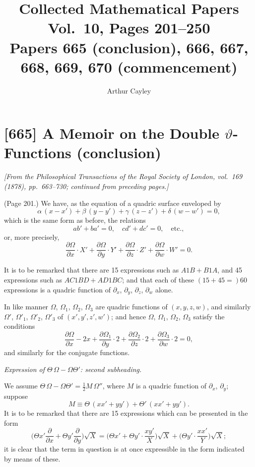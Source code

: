 \documentclass[11pt,a4paper]{article}
\title{\textbf{Collected Mathematical Papers}\\[4pt]
\Large Vol.~10, Pages 201--250\\[8pt]
\large Papers 665 (conclusion), 666, 667, 668, 669, 670 (commencement)}
\author{Arthur Cayley}
\date{}
\theoremstyle{plain}
\theoremstyle{definition}
\newcommand{\te}{\vartheta} %
\newcommand{\Th}{\Theta} %
\begin{document}
\maketitle
\thispagestyle{fancy}

\tableofcontents
\newpage

\section{[665] A Memoir on the Double \texorpdfstring{$\te$}{theta}-Functions (conclusion)}
\label{sec:665}

\noindent\textit{[From the \emph{Philosophical Transactions of the Royal Society of London}, vol.~169 (1878), pp.~663--730; continued from preceding pages.]}

\medskip

\noindent (Page 201.) We have, as the equation of a quadric surface enveloped by
\[
\alpha\,(x - x') + \beta\,(y - y') + \gamma\,(z - z') + \delta\,(w - w') = 0,
\]
which is the same form as before, the relations
\[
ab' + ba' = 0, \quad cd' + dc' = 0, \quad \text{etc.},
\]
or, more precisely,
\[
\frac{\partial\Omega}{\partial x} \cdot X' + \frac{\partial\Omega}{\partial y} \cdot Y' + \frac{\partial\Omega}{\partial z} \cdot Z' + \frac{\partial\Omega}{\partial w} \cdot W' = 0.
\]

It is to be remarked that there are 15 expressions such as $A1B + B1A$, and 45 expressions such as $AC1BD + AD1BC$; and that each of these $(15 + 45 = ) 60$ expressions is a quadric function of $\partial_x$, $\partial_y$, $\partial_z$, $\partial_w$ alone.

In like manner $\Omega$, $\Omega_1$, $\Omega_2$, $\Omega_3$ are quadric functions of $(x, y, z, w)$, and similarly $\Omega'$, $\Omega'_1$, $\Omega'_2$, $\Omega'_3$ of $(x', y', z', w')$; and hence $\Omega$, $\Omega_1$, $\Omega_2$, $\Omega_3$ satisfy the conditions
\[
\frac{\partial\Omega}{\partial x} - 2x + \frac{\partial\Omega_1}{\partial y} \cdot 2 + \frac{\partial\Omega_2}{\partial z} \cdot 2 + \frac{\partial\Omega_3}{\partial w} \cdot 2 = 0,
\]
and similarly for the conjugate functions.

\medskip

\noindent \textit{Expression of $\Th\,\Omega - \Omega\Th'$: second subheading.}

We assume $\Th\,\Omega - \Omega\Th' = \tfrac{1}{2}M\,\Omega''$, where $M$ is a quadric function of $\partial_x$, $\partial_y$; suppose
\[
M \equiv \Th\,(x x' + y y') + \Th'\,(x x' + y y').
\]
It is to be remarked that there are 15 expressions which can be presented in the form
\[
\Big(\Th x' \frac{\partial}{\partial x} + \Th y' \frac{\partial}{\partial y}\Big) \sqrt{X} = \Big( \Th x' + \Th y' \cdot \frac{x y'}{X} \Big) \sqrt{X} + \Big(\Th y' \cdot \frac{x x'}{Y}\Big) \sqrt{X};
\]
it is clear that the term in question is at once expressible in the form indicated by means of these.
\end{document}
